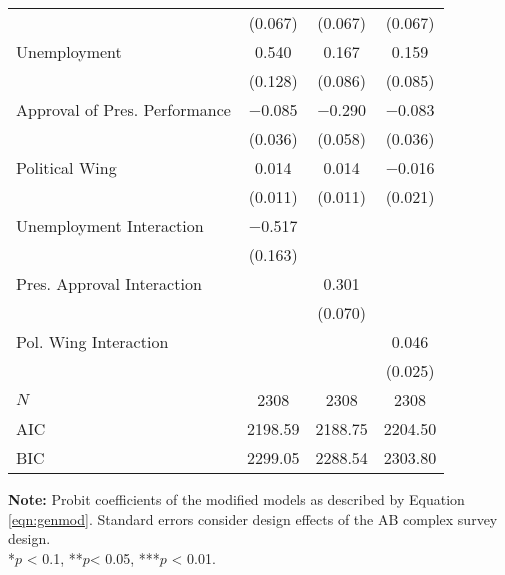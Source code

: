 \documentclass[12pt,a4]{article}
\begin{document}
\begin{table}[htbp]
\begin{center}
\begin{tabular}[t]{lccc}
 & (\num{0.067}) & (\num{0.067}) & (\num{0.067})\\
Unemployment & \num{0.540} & \num{0.167} & \num{0.159}\\
 & (\num{0.128}) & (\num{0.086}) & (\num{0.085})\\
Approval of Pres. Performance & \num{-0.085} & \num{-0.290} & \num{-0.083}\\
 & (\num{0.036}) & (\num{0.058}) & (\num{0.036})\\
Political Wing & \num{0.014} & \num{0.014} & \num{-0.016}\\
 & (\num{0.011}) & (\num{0.011}) & (\num{0.021})\\
Unemployment Interaction & \num{-0.517} &  & \\
 & (\num{0.163}) &  & \\
Pres. Approval Interaction &  & \num{0.301} & \\
 &  & (\num{0.070}) & \\
Pol. Wing Interaction &  &  & \num{0.046}\\
 &  &  & (\num{0.025})\\
\midrule
$N$ & \num{2308} & \num{2308} & \num{2308}\\
AIC & \num{2198.59} & \num{2188.75} & \num{2204.50}\\
BIC & \num{2299.05} & \num{2288.54} & \num{2303.80}\\
\bottomrule
\end{tabular}


\end{center}
\textbf{Note:} Probit coefficients of the modified models as described by Equation \ref{eqn:genmod}. Standard errors consider design effects of the AB complex survey design.\\
*$p$ < 0.1, **$p$< 0.05, ***$p$ < 0.01.
\end{table}

\end{document}
